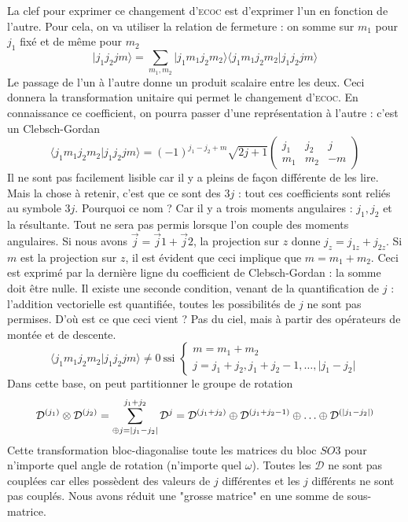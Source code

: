 La clef pour exprimer ce changement d'\textsc{ecoc} est d'exprimer l'un en fonction de l'autre. 
Pour cela, on va utiliser la relation de fermeture : on somme sur $m_1$ pour $j_1$ fixé et de 
même pour $m_2$
\begin{equation}
\vert j_1 j_2 j m \rangle = 
\sum_{m_1,m_2} \vert j_1 m_1 j_2 m_2 \rangle \langle 
j_1 m_1 j_2 m_2 
\vert j_1 j_2 j m \rangle 
\end{equation}
Le passage de l'un à l'autre donne un produit scalaire entre les deux. Ceci donnera la transformation
unitaire qui permet le changement d'\textsc{ecoc}. En connaissance ce coefficient, 
on pourra passer d'une représentation à l'autre : c'est un Clebsch-Gordan
\begin{equation}
\langle j_1 m_1 j_2 m_2 \vert j_1 j_2 j m \rangle= (-1)^{j_1 - j_2 + m} \sqrt{2j+1} \left(
\begin{array}{ccc}
j_1 & j_2 & j \\
m_1 & m_2 & -m 
\end{array} \right)
\end{equation}
Il ne sont pas facilement lisible car il y a pleins de façon différente de les lire. Mais la chose
à retenir, c'est que ce sont des $3j$ : tout ces coefficients sont reliés au symbole $3j$. Pourquoi
ce nom ? Car il y a trois moments angulaires : $j_1,j_2$ et la résultante. Tout ne sera pas permis
lorsque l'on couple des moments angulaires. Si nous avons $\vec j = \vec j1 + \vec j2$, la projection
sur $z$ donne $j_z=j_{1z}+j_{2z}$. Si $m$ est la projection sur $z$, il est évident que ceci implique
que $m=m_1+m_2$. Ceci est exprimé par la dernière ligne du coefficient de Clebsch-Gordan : la
somme doit être nulle. Il existe une seconde condition, venant de la quantification de $j$ :
l'addition vectorielle est quantifiée, toutes les possibilités de $j$ ne sont pas permises. D'où 
est ce que ceci vient ? Pas du ciel, mais à partir des opérateurs de montée et de descente.
\begin{equation}
\langle j_1 m_1 j_2 m_2 \vert j_1 j_2 j m \rangle \neq 0 ~\mbox{ssi }
\left\{
\begin{array}{l}
m = m_1 + m_2 \\
j = j_1 + j_2, j_1 + j_2 -1, \ldots, \vert j_1 - j_2 \vert
\end{array} \right.
\end{equation}
Dans cette base, on peut partitionner le groupe de rotation
\begin{equation}
{\cal D}^{(j_1)} \otimes {\cal D}^{(j_2)} = \sum_{\oplus j = |j_1-j_2|}^{j_1+j_2}\mathcal{D}^j=
{\cal D}^{(j_1+j_2)} \oplus  {\cal D}^{(j_1+j_2-1 )} \oplus
\ldots \oplus {\cal D}^{(\vert j_1-j_2 \vert)}
\end{equation}
Cette transformation bloc-diagonalise toute les matrices du bloc $SO3$ pour n'importe quel
angle de rotation (n'importe quel $\omega$). Toutes les $\mathcal{D}$ ne sont pas couplées car
elles possèdent des valeurs de $j$ différentes et les $j$ différents ne sont pas couplés. Nous
avons réduit une "grosse matrice" en une somme de sous-matrice.

